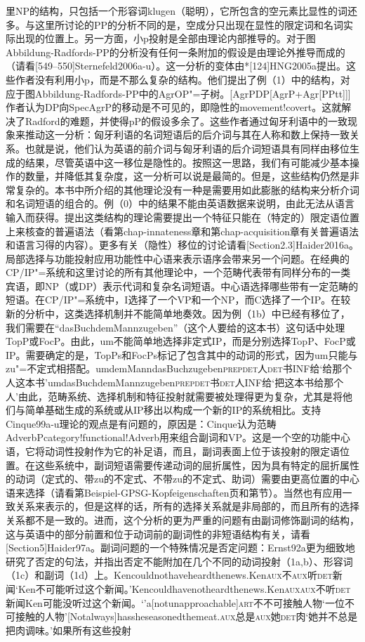 里NP的结构，只包括一个形容词klugen（聪明），它所包含的空元素比显性的词还多。与这里所讨论的PP的分析不同的是，空成分只出现在显性的限定词和名词实际出现的位置上。另一方面，小p投射是全部由理论内部推导的。对于图Abbildung-Radfords-PP的分析没有任何一条附加的假设是由理论外推导而成的（请看[549--550]Sternefeld2006a-u）。这一分析的变体由*[124]HNG2005a提出。这些作者没有利用小p，而是不那么复杂的结构。他们提出了例（1）中的结构，对应于图Abbildung-Radfords-PP中的AgrOP"=子树。[AgrPDP[AgrP+Agr[PPtt]]]作者认为DP向SpecAgrP的移动是不可见的，即隐性的movement!covert。这就解决了Radford的难题，并使得pP的假设多余了。这些作者通过匈牙利语中的一致现象来推动这一分析：匈牙利语的名词短语后的后介词与其在人称和数上保持一致关系。也就是说，他们认为英语的前介词与匈牙利语的后介词短语具有同样由移位生成的结果，尽管英语中这一移位是隐性的。按照这一思路，我们有可能减少基本操作的数量，并降低其复杂度，这一分析可以说是最简的。但是，这些结构仍然是非常复杂的。本书中所介绍的其他理论没有一种是需要用如此膨胀的结构来分析介词和名词短语的组合的。例（0）中的结果不能由英语数据来说明，由此无法从语言输入而获得。提出这类结构的理论需要提出一个特征只能在（特定的）限定语位置上来核查的普遍语法（看第chap-innateness章和第chap-acquisition章有关普遍语法和语言习得的内容）。更多有关（隐性）移位的讨论请看[Section2.3]Haider2016a。局部选择与功能投射应用功能性中心语来表示语序会带来另一个问题。在经典的CP/IP"=系统和这里讨论的所有其他理论中，一个范畴代表带有同样分布的一类宾语，即NP（或DP）表示代词和复杂名词短语。中心语选择哪些带有一定范畴的短语。在CP/IP"=系统中，I选择了一个VP和一个NP，而C选择了一个IP。在较新的分析中，这类选择机制并不能简单地奏效。因为例（1b）中已经有移位了，我们需要在“dasBuchdemMannzugeben”（这个人要给的这本书）这句话中处理TopP或FocP。由此，um不能简单地选择非定式IP，而是分别选择TopP、FocP或IP。需要确定的是，TopPs和FocPs标记了包含其中的动词的形式，因为um只能与zu"=不定式相搭配。umdemManndasBuchzugeben\textsc{prep}\textsc{det}人\textsc{det}书INF给`给那个人这本书'umdasBuchdemMannzugeben\textsc{prep}\textsc{det}书\textsc{det}人INF给`把这本书给那个人'由此，范畴系统、选择机制和特征投射就需要被处理得更为复杂，尤其是将他们与简单基础生成的系统或从IP移出以构成一个新的IP的系统相比。支持Cinque99a-u理论的观点是有问题的，原因是：Cinque认为范畴AdverbPcategory!functional!Adverb用来组合副词和VP。这是一个空的功能中心语，它将动词性投射作为它的补足语，而且，副词表面上位于该投射的限定语位置。在这些系统中，副词短语需要传递动词的屈折属性，因为具有特定的屈折属性的动词（定式的、带zu的不定式、不带zu的不定式、助词）需要由更高位置的中心语来选择（请看第Beispiel-GPSG-Kopfeigenschaften页和第节）。当然也有应用一致关系来表示的，但是这样的话，所有的选择关系就是非局部的，而且所有的选择关系都不是一致的。进而，这个分析的更为严重的问题有由副词修饰副词的结构，这与英语中的部分前置和位于动词前的副词性的非短语结构有关，请看[Section5]Haider97a。副词问题的一个特殊情况是否定问题：Ernst92a更为细致地研究了否定的句法，并指出否定不能附加在几个不同的动词投射（1a,b）、形容词（1c）和副词（1d）上。Kencouldnothaveheardthenews.Ken\textsc{aux}不\textsc{aux}听\textsc{det}新闻`Ken不可能听过这个新闻。'Kencouldhavenotheardthenews.Ken\textsc{aux}\textsc{aux}不听\textsc{det}新闻Ken可能没听过这个新闻。`'a[notunapproachable]\textsc{art}不不可接触人物`一位不可接触的人物'[Notalways]hassheseasonedthemeat.\textsc{aux}总是\textsc{aux}她\textsc{det}肉`她并不总是把肉调味。'如果所有这些投射
